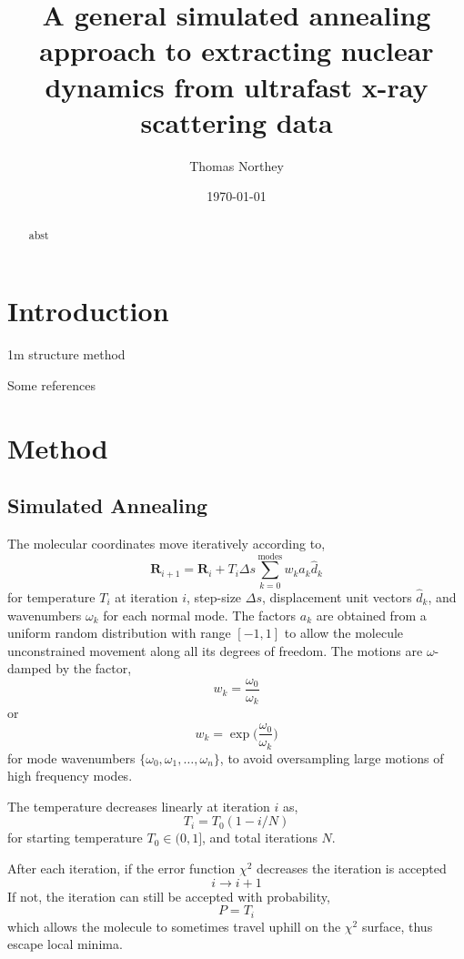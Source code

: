 \documentclass[]{article}
\title{A general simulated annealing approach to extracting nuclear dynamics from ultrafast x-ray scattering data}
\author{Thomas Northey}
\date{\today}
\begin{document}
	
	\maketitle
	
	\begin{abstract}
		abst
	\end{abstract}
	
	\section{Introduction}
	1m structure method \cite{yong2021determination}
	
	Some references \cite{yong2019scattering,yong2021determination,stankus2019ultrafast,wolf2019photochemical,moreno2019ab,northey2014ab,northey2016elastic}
	
	\section{Method}
	
	\subsection{Simulated Annealing}
	
	The molecular coordinates move iteratively according to,
	\[
	\textbf{R}_{i+1} = \textbf{R}_{i} + T_i\Delta s\sum_{k=0}^{\textrm{modes}}w_k a_k\hat{d}_k
	\]
	for temperature $T_i$ at iteration $i$, step-size $\Delta s$, displacement unit vectors $\hat{d}_k$, and wavenumbers $\omega_k$ for each normal mode. The factors $a_k$ are obtained from a uniform random distribution with range $[-1, 1]$ to allow the molecule unconstrained movement along all its degrees of freedom.
	The motions are $\omega$-damped by the factor,
	\[
	w_k = \frac{\omega_0}{\omega_k}
	\]
	or
	\[
	w_k = \exp\Big(\frac{\omega_0}{\omega_k}\Big)
	\]
	for mode wavenumbers $\{\omega_0, \omega_1, \dots, \omega_n\}$, to avoid oversampling large motions of high frequency modes.
	
	The temperature decreases linearly at iteration $i$ as,
	\[
	T_i = T_0(1 - i / N)
	\]
	for starting temperature $T_0\in(0, 1]$, and total iterations $N$.
	
	After each iteration, if the error function $\chi^2$ decreases the iteration is accepted
	\[
	i\rightarrow i+1
	\]
	If not, the iteration can still be accepted with probability,
	\[
	P = T_i
	\]
	which allows the molecule to sometimes travel uphill on the $\chi^2$ surface, thus escape local minima.
	
\end{document}
